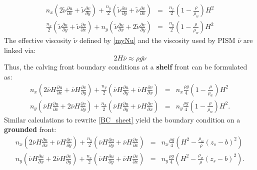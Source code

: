 \documentclass[a4paper,10pt]{article}
\begin{document}
\begin{eqnarray*}
n_x\left(2\tilde{\nu}\frac{\partial u}{\partial x}+\tilde{\nu}\frac{\partial v}{\partial y}  \right) + \frac{n_y}{2} \left(\tilde{\nu}\frac{\partial u}{\partial y} + \tilde{\nu}\frac{\partial v}{\partial x} \right) & =  & \frac{n_x}{2}\left(1-\frac{\rho}{\rho_w}\right)H^2\\
\frac{n_x}{2} \left(\tilde{\nu}\frac{\partial u}{\partial y} + \tilde{\nu}\frac{\partial v}{\partial x} \right) + n_y\left(\tilde{\nu}\frac{\partial u}{\partial x}+2\tilde{\nu}\frac{\partial v}{\partial y}  \right) & = & \frac{n_y}{2}\left(1-\frac{\rho}{\rho_w}\right)H^2
\end{eqnarray*}
The effective viscosity $\tilde{\nu}$ defined by \eqref{myNu} and the viscosity used by PISM $\overline{\nu}$ are linked via:
\begin{equation*}%
2H\overline\nu\approx\rho g\tilde{\nu}
\label{nuLink}
\end{equation*}
Thus, the calving front boundary conditions at a \textbf{shelf} front can be formulated as:
\begin{eqnarray}%
n_x\left(2\overline{\nu}H\frac{\partial u}{\partial x}+\overline{\nu}H\frac{\partial v}{\partial y}  \right) + \frac{n_y}{2} \left(\overline{\nu}H\frac{\partial u}{\partial y} + \overline{\nu}H\frac{\partial v}{\partial x} \right) & =  & n_x\frac{\rho g}{4}\left(1-\frac{\rho}{\rho_w}\right)H^2 \label{calv_BC1}\\
 n_y\left(\overline{\nu}H\frac{\partial u}{\partial x}+2\overline{\nu}H\frac{\partial v}{\partial y}  \right) + \frac{n_x}{2} \left(\overline{\nu}H\frac{\partial u}{\partial y} + \overline{\nu}H\frac{\partial v}{\partial x} \right) & = & n_y\frac{\rho g}{4}\left(1-\frac{\rho}{\rho_w}\right)H^2 . \label{calv_BC2}
\end{eqnarray}
Similar calculations to rewrite \eqref{BC_sheet} yield the boundary condition on a \textbf{grounded} front:
\begin{eqnarray}%
n_x\left(2\overline{\nu}H\frac{\partial u}{\partial x}+\overline{\nu}H\frac{\partial v}{\partial y}  \right) + \frac{n_y}{2} \left(\overline{\nu}H\frac{\partial u}{\partial y} + \overline{\nu}H\frac{\partial v}{\partial x} \right) & =  & n_x\frac{\rho g}{4}\left(H^2-\frac{\rho_w}{\rho}( z_s-b)^2  \right) \label{sheet_BC1}\\
 n_y\left(\overline{\nu}H\frac{\partial u}{\partial x}+2\overline{\nu}H\frac{\partial v}{\partial y}  \right) + \frac{n_x}{2} \left(\overline{\nu}H\frac{\partial u}{\partial y} + \overline{\nu}H\frac{\partial v}{\partial x} \right) & = & n_y\frac{\rho g}{4}\left(H^2-\frac{\rho_w}{\rho}(z_s - b)^2 \right). \label{sheet_BC2}
\end{eqnarray}
\end{document}
